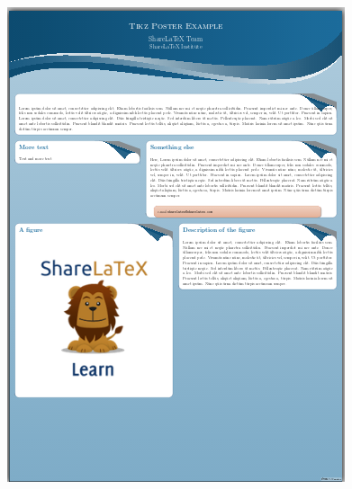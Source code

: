 \documentclass[25pt, a0paper, portrait]{tikzposter}
\begin{document}
\begin{columns}
{\begin{tikzfigure}
	    \includegraphics[width=\linewidth]{Tikzposter_theme/Wave}
	\end{tikzfigure}
    }
    {
	\begin{tikzfigure}

\end{tikzfigure}}
\end{columns}
\end{document}
